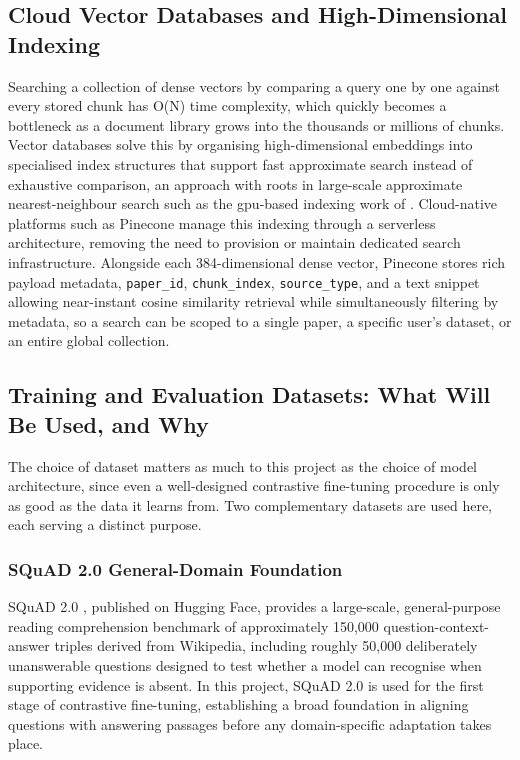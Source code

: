 \subsection{Cloud Vector Databases and High-Dimensional Indexing}

Searching a collection of dense vectors by comparing a query one by one against every stored chunk has O(N) time complexity, which quickly becomes a bottleneck as a document library grows into the thousands or millions of chunks. Vector databases solve this by organising high-dimensional embeddings into specialised index structures that support fast approximate search instead of exhaustive comparison, an approach with roots in large-scale approximate nearest-neighbour search such as the \gls{gpu}-based indexing work of \citet{johnson2019billion}.
\newline \newline Cloud-native platforms such as Pinecone manage this indexing through a serverless architecture, removing the need to provision or maintain dedicated search infrastructure. Alongside each 384-dimensional dense vector, Pinecone stores rich payload metadata, \verb|paper_id|, \verb|chunk_index|, \verb|source_type|, and a text snippet allowing near-instant cosine similarity retrieval while simultaneously filtering by metadata, so a search can be scoped to a single paper, a specific user's dataset, or an entire global collection.

\subsection{Training and Evaluation Datasets: What Will Be Used, and Why}

The choice of dataset matters as much to this project as the choice of model architecture, since even a well-designed contrastive fine-tuning procedure is only as good as the data it learns from. Two complementary datasets are used here, each serving a distinct purpose.

\subsubsection{ SQuAD 2.0 General-Domain Foundation}

SQuAD 2.0 \citep{rajpurkar2018know}, published on Hugging Face, provides a large-scale, general-purpose reading comprehension benchmark of approximately 150,000 question-context-answer triples derived from Wikipedia, including roughly 50,000 deliberately unanswerable questions designed to test whether a model can recognise when supporting evidence is absent. In this project, SQuAD 2.0 is used for the first stage of contrastive fine-tuning, establishing a broad foundation in aligning questions with answering passages before any domain-specific adaptation takes place.

